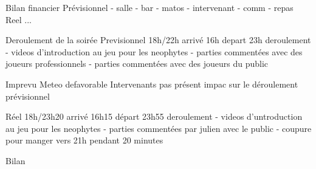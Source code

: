        Bilan financier 
                Prévisionnel
                    - salle 
                    - bar
                    - matos
                    - intervenant
                    - comm
                    - repas
                Reel
                   ...

        Deroulement de la soirée 
                Previsionnel
                    18h/22h
                    arrivé 16h
                    depart 23h
                    deroulement
                        - videos d'introduction au jeu pour les neophytes
                        - parties commentées avec des joueurs professionnels
                        - parties commentées avec des joueurs du public

                Imprevu
                   Meteo defavorable 
                   Intervenants pas présent 
                   impac sur le déroulement prévisionnel

                Réel
                    18h/23h20
                    arrivé 16h15
                    départ 23h55
                    deroulement
                        - videos d'untroduction au jeu pour les neophytes
                        - parties commentées par julien avec le public
                        - coupure pour manger vers 21h pendant 20 minutes

Bilan
